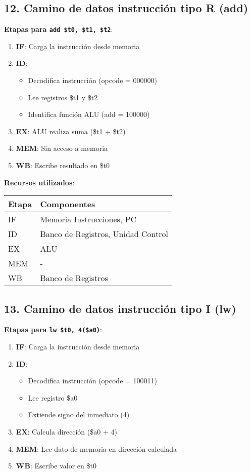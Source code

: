 \documentclass{article}
\begin{document}
\subsection*{12. Camino de datos instrucción tipo R (add)}
\textbf{Etapas para \texttt{add \$t0, \$t1, \$t2}}:
\begin{enumerate}
  \item \textbf{IF}: Carga la instrucción desde memoria
  \item \textbf{ID}: 
  \begin{itemize}
    \item Decodifica instrucción (opcode = 000000)
    \item Lee registros \$t1 y \$t2
    \item Identifica función ALU (add = 100000)
  \end{itemize}
  \item \textbf{EX}: ALU realiza suma (\$t1 + \$t2)
  \item \textbf{MEM}: Sin acceso a memoria
  \item \textbf{WB}: Escribe resultado en \$t0
\end{enumerate}

\textbf{Recursos utilizados}:
\begin{center}
  \begin{tabular}{l|l}
    \textbf{Etapa} & \textbf{Componentes} \\
    \hline
    IF & Memoria Instrucciones, PC \\
    ID & Banco de Registros, Unidad Control \\
    EX & ALU \\
    MEM & - \\
    WB & Banco de Registros \\
  \end{tabular}
\end{center}

\subsection*{13. Camino de datos instrucción tipo I (lw)}
\textbf{Etapas para \texttt{lw \$t0, 4(\$a0)}}:
\begin{enumerate}
  \item \textbf{IF}: Carga la instrucción desde memoria
  \item \textbf{ID}: 
  \begin{itemize}
    \item Decodifica instrucción (opcode = 100011)
    \item Lee registro \$a0
    \item Extiende signo del inmediato (4)
  \end{itemize}
  \item \textbf{EX}: Calcula dirección (\$a0 + 4)
  \item \textbf{MEM}: Lee dato de memoria en dirección calculada
  \item \textbf{WB}: Escribe valor en \$t0
\end{enumerate}
\end{document}
